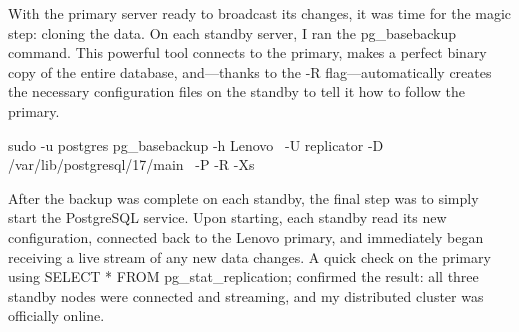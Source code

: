 \documentclass[conference]{IEEEtran}
\begin{document}
With the primary server ready to broadcast its changes, it was time for the magic step: cloning the data. On each standby server, I ran the pg\_basebackup command. This powerful tool connects to the primary, makes a perfect binary copy of the entire database, and—thanks to the -R flag—automatically creates the necessary configuration files on the standby to tell it how to follow the primary.

sudo -u postgres pg\_basebackup -h Lenovo \
-U replicator -D /var/lib/postgresql/17/main \
-P -R -Xs

After the backup was complete on each standby, the final step was to simply start the PostgreSQL service. Upon starting, each standby read its new configuration, connected back to the Lenovo primary, and immediately began receiving a live stream of any new data changes. A quick check on the primary using SELECT * FROM pg\_stat\_replication; confirmed the result: all three standby nodes were connected and streaming, and my distributed cluster was officially online.


%
\end{document}
